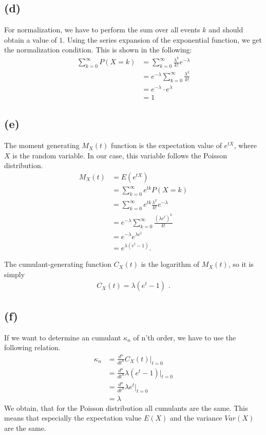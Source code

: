 \documentclass{article}
\begin{document}
\subsection*{(d)}
For normalization, we have to perform the sum over all events $k$ and should obtain a value of $1$. Using the series expansion of the exponential function, we get the normalization condition. This is shown in the following:
\begin{align}
\sum_{k=0}^{\infty} P(X = k)
&= \sum_{k=0}^{\infty} \frac{\lambda^k}{k!} e^{-\lambda} \\
&= e^{-\lambda} \sum_{k=0}^{\infty} \frac{\lambda^k}{k!} \\
&= e^{-\lambda} \cdot e^{\lambda} \\
&= 1
\end{align}

\subsection*{(e)}
The moment generating $M_X(t)$ function is the expectation value of $e^{tX}$, where $X$ is the random variable. In our case, this variable follows the Poisson distribution.
\begin{align}
M_X(t)
&= E(e^{tX}) \\
&= \sum_{k=0}^{\infty} e^{tk} P(X=k) \\
&= \sum_{k=0}^{\infty} e^{tk} \frac{\lambda^k}{k!} e^{-\lambda} \\
&= e^{-\lambda} \sum_{k=0}^{\infty} \frac{(\lambda e^t)^k}{k!} \\
&= e^{-\lambda} e^{\lambda e^t} \\
&= e^{\lambda(e^t-1)}.
\end{align}

The cumulant-generating function $C_X(t)$ is the logarithm of $M_X(t)$, so it is simply
\begin{align}
    C_X(t) =\lambda \left( e^t - 1 \right) \text{ .}
\end{align}

\subsection*{(f)}
If we want to determine an cumulant $\kappa_n$ of n'th order, we have to use the following relation.
\begin{align}
\kappa_n
&= \frac{d^n}{dt^n} C_X(t) \left. \right|_{t=0} \\
&= \frac{d^n}{dt^n} \lambda \left( e^t - 1 \right) \left. \right|_{t=0} \\
&= \frac{d^n}{dt^n} \lambda e^t  \left. \right|_{t=0} \\
&= \lambda
\end{align}
We obtain, that for the Poisson distribution all cumulants are the same. This means that especially the expectation value $E(X)$ and the variance $Var(X)$ are the same.
\end{document}
